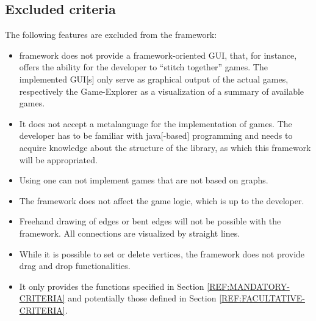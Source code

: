 \subsection{Excluded criteria}
The following features are excluded from the framework:

\begin{itemize}
	\item {\graphioli} framework does not provide a framework-oriented \gls{GUI}, that, for instance, offers the ability for the developer to ``stitch together'' games. The implemented \gls{GUI}[s] only serve as graphical output of the actual games, respectively the Game-Explorer as a visualization of a summary of available games.
	\item It does not accept a \gls{metalanguage} for the implementation of games. The \gls{developer} has to be familiar with \Gls{java}[-based] programming and needs to acquire knowledge about the structure of the \gls{library}, as which this framework will be appropriated.
	\item Using {\graphioli} one can not implement \glspl{game} that are not based on \glspl{graph}.
	\item The framework does not affect the game logic, which is up to the developer.
	\item Freehand drawing of \glspl{edge} or bent edges will not be possible with the {\graphioli} framework. All connections are visualized by straight lines.
	\item While it is possible to set or delete vertices, the framework does not provide drag and drop functionalities.
	\item It only provides the functions specified in Section \ref{REF:MANDATORY-CRITERIA} and potentially those defined in Section \ref{REF:FACULTATIVE-CRITERIA}.
\end{itemize}